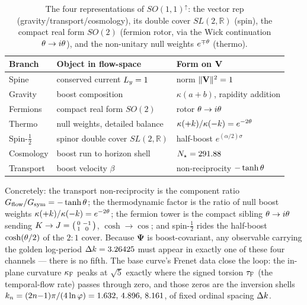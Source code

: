 \begin{table}[ht]
\centering
\begin{tabular}{lll}
\toprule
Branch & Object in flow-space & Form on $\mathbf{V}$ \\
\midrule
Spine & conserved current $L_{y}=1$ & norm $\|\mathbf{V}\|^2=1$ \\
Gravity & boost composition & $\kappa(a{+}b)$, rapidity addition \\
Fermions & compact real form $SO(2)$ & rotor $\theta\to i\theta$ \\
Thermo & null weights, detailed balance & $\kappa(+k)/\kappa(-k)=e^{-2\theta}$ \\
Spin-$\tfrac12$ & spinor double cover $SL(2,\mathbb R)$ & half-boost $e^{(\alpha/2)\sigma}$ \\
Cosmology & boost run to horizon shell & $N_{\star}=291.88$ \\
Transport & boost velocity $\beta$ & non-reciprocity $-\tanh\theta$ \\
\bottomrule
\end{tabular}
\caption{The four representations of $SO(1,1)^{\uparrow}$: the vector rep
(gravity/transport/cosmology), its double cover $SL(2,\mathbb R)$ (spin), the compact real form
$SO(2)$ (fermion rotor, via the Wick continuation $\theta\to i\theta$), and the non-unitary null
weights $e^{\mp\theta}$ (thermo).}
\label{tab:twovector:reps}
\end{table}

\noindent
Concretely: the transport non-reciprocity is the component ratio $G_{\mathrm{flow}}/G_{\mathrm{sym}}=-\tanh\theta$;
the thermodynamic factor is the ratio of null boost weights $\kappa(+k)/\kappa(-k)=e^{-2\theta}$;
the fermion tower is the compact sibling $\theta\to i\theta$ sending
$K\to J=\big(\begin{smallmatrix}0&-1\\1&0\end{smallmatrix}\big)$, $\cosh\to\cos$; and
spin-$\tfrac12$ rides the half-boost $\cosh(\theta/2)$ of the $2{:}1$ cover. Because $\boldsymbol\Psi$
is boost-covariant, any observable carrying the golden log-period $\Delta k=3.26425$ must appear in
exactly one of these four channels --- there is no fifth. The base curve's Frenet data close the
loop: the in-plane curvature $\kappa_{\mathrm{F}}$ peaks at $\sqrt5$ exactly where the signed torsion $\tau_{\mathrm{F}}$
(the temporal-flow rate) passes through zero, and those zeros are the inversion shells
$k_n=(2n{-}1)\pi/(4\ln\varphi)=1.632,\,4.896,\,8.161$, of fixed ordinal spacing $\Delta k$.

